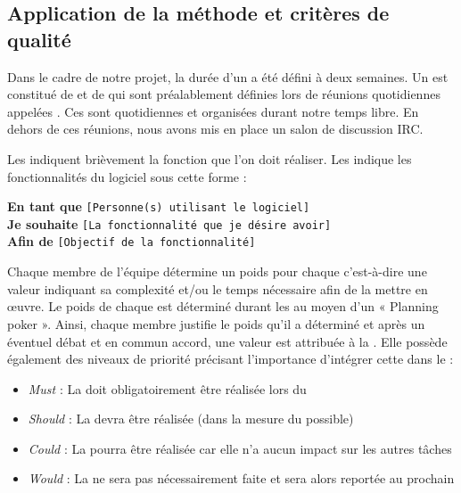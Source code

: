 \subsection{Application de la méthode  et critères de qualité}
Dans le cadre de notre projet, la durée d'un  a été défini à deux semaines. Un  est constitué de  et de 
 qui sont préalablement définies lors de réunions quotidiennes appelées . Ces  sont quotidiennes et organisées durant notre temps libre. En dehors de ces réunions, nous avons mis en place un salon
de discussion IRC.  

Les  indiquent brièvement la fonction que l'on doit réaliser. Les  indique les fonctionnalités du logiciel sous cette forme :

\begin{exemple}
	\textbf{En tant que} \texttt{[Personne(s) utilisant le logiciel]}\\
	\textbf{Je souhaite} \texttt{[La fonctionnalité que je désire avoir]}\\
	\textbf{Afin de} \texttt{[Objectif de la fonctionnalité]}
\end{exemple}

Chaque membre de l'équipe détermine un poids pour chaque  c'est-à-dire une valeur indiquant sa complexité et/ou le temps nécessaire afin de la mettre en œuvre. Le poids de chaque  est déterminé durant les  au moyen d’un « Planning poker ».  Ainsi, chaque membre justifie le poids qu'il a déterminé et après un éventuel débat et en commun accord, une valeur est attribuée à la . Elle possède également des niveaux de priorité précisant
l'importance d’intégrer cette  dans le : 

\begin{itemize}
	\item \textit{Must} : La  doit obligatoirement être réalisée lors du 
	\item \textit{Should} : La  devra être réalisée (dans la mesure du possible)
	\item \textit{Could} : La  pourra être réalisée car elle n’a aucun impact sur les autres tâches
	\item \textit{Would} : La  ne sera pas nécessairement faite et sera alors reportée au prochain 
\end{itemize}

